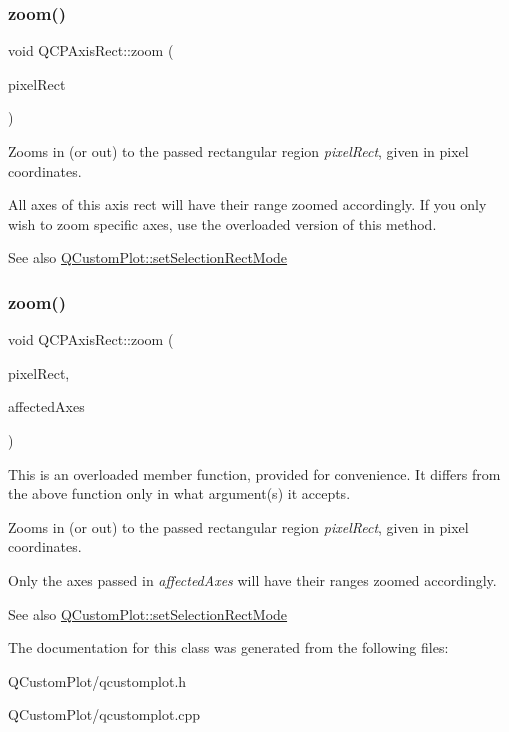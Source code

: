 \subsubsection{\texorpdfstring{zoom()}{zoom()}\hspace{0.1cm}{\footnotesize\ttfamily [1/2]}}
{\footnotesize\ttfamily void Q\+C\+P\+Axis\+Rect\+::zoom (\begin{DoxyParamCaption}\item[{const Q\+RectF \&}]{pixel\+Rect }\end{DoxyParamCaption})}

Zooms in (or out) to the passed rectangular region {\itshape pixel\+Rect}, given in pixel coordinates.

All axes of this axis rect will have their range zoomed accordingly. If you only wish to zoom specific axes, use the overloaded version of this method.

\begin{DoxySeeAlso}{See also}
\mbox{\hyperlink{class_q_custom_plot_a810ef958ebe84db661c7288b526c0deb}{Q\+Custom\+Plot\+::set\+Selection\+Rect\+Mode}} 
\end{DoxySeeAlso}
\mbox{\label{class_q_c_p_axis_rect_a6a39fb3aea60a8c503bdcb3f0477d2f6}} 
\subsubsection{\texorpdfstring{zoom()}{zoom()}\hspace{0.1cm}{\footnotesize\ttfamily [2/2]}}
{\footnotesize\ttfamily void Q\+C\+P\+Axis\+Rect\+::zoom (\begin{DoxyParamCaption}\item[{const Q\+RectF \&}]{pixel\+Rect,  }\item[{const Q\+List$<$ \mbox{\hyperlink{class_q_c_p_axis}{Q\+C\+P\+Axis}} $\ast$$>$ \&}]{affected\+Axes }\end{DoxyParamCaption})}

This is an overloaded member function, provided for convenience. It differs from the above function only in what argument(s) it accepts.

Zooms in (or out) to the passed rectangular region {\itshape pixel\+Rect}, given in pixel coordinates.

Only the axes passed in {\itshape affected\+Axes} will have their ranges zoomed accordingly.

\begin{DoxySeeAlso}{See also}
\mbox{\hyperlink{class_q_custom_plot_a810ef958ebe84db661c7288b526c0deb}{Q\+Custom\+Plot\+::set\+Selection\+Rect\+Mode}} 
\end{DoxySeeAlso}


The documentation for this class was generated from the following files\+:\begin{DoxyCompactItemize}
\item 
Q\+Custom\+Plot/qcustomplot.\+h\item 
Q\+Custom\+Plot/qcustomplot.\+cpp\end{DoxyCompactItemize}
